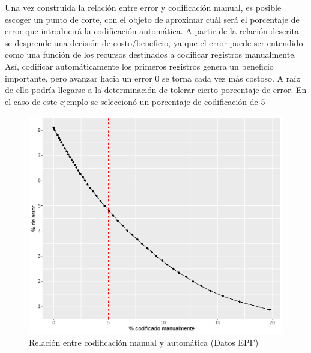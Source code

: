 \documentclass[
  12pt,
  spanish,
]{article}
\begin{document}
\begin{itemize}
\newline
\newline Una vez construida la relación entre error y codificación manual, es posible escoger un punto de corte, con el objeto de aproximar cuál será el porcentaje de error que introducirá la codificación automática. A partir de la relación descrita se desprende una decisión de costo/beneficio, ya que el error puede ser entendido como una función de los recursos destinados a codificar registros manualmente. Así, codificar automáticamente los primeros registros genera un beneficio importante, pero avanzar hacia un error 0 se torna cada vez más costoso. A raíz de ello podría llegarse a la determinación de tolerar cierto porcentaje de error. En el caso de este ejemplo se seleccionó un porcentaje de codificación de 5%


\begin{figure}[H]
\centering
\large
\caption{Relación entre codificación manual y automática (Datos EPF)}
\label{manual_vs_automatico}
\includegraphics[width=0.7\columnwidth]{imagenes/manual_vs_automatico.png}
\normalsize
\end{figure}



\end{itemize}
\end{document}
